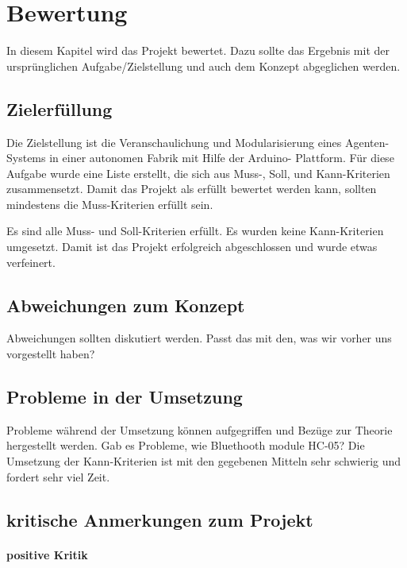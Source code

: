 \chapter{Bewertung}

In diesem Kapitel wird das Projekt bewertet. Dazu sollte das Ergebnis mit der ursprünglichen Aufgabe/Zielstellung und auch dem Konzept abgeglichen werden. 

\section{Zielerfüllung}

Die Zielstellung ist die Veranschaulichung und Modularisierung eines Agenten-Systems in einer autonomen Fabrik mit Hilfe der Arduino- Plattform. Für diese Aufgabe wurde eine Liste erstellt, die sich aus Muss-, Soll, und Kann-Kriterien zusammensetzt. Damit das Projekt als erfüllt bewertet werden kann, sollten mindestens die Muss-Kriterien erfüllt sein.

Es sind alle Muss- und Soll-Kriterien erfüllt. Es wurden keine Kann-Kriterien umgesetzt. Damit ist das Projekt erfolgreich abgeschlossen und wurde etwas verfeinert.

\section{Abweichungen zum Konzept}

Abweichungen sollten diskutiert werden. 
Passt das mit den, was wir vorher uns vorgestellt haben? 

\section{Probleme in der Umsetzung}

Probleme während der Umsetzung können aufgegriffen und Bezüge zur Theorie hergestellt werden.
Gab es Probleme, wie Bluethooth module HC-05?
Die Umsetzung der Kann-Kriterien ist mit den gegebenen Mitteln sehr schwierig und fordert sehr viel Zeit.

\section{kritische Anmerkungen zum Projekt}

\subsubsection{positive Kritik}


